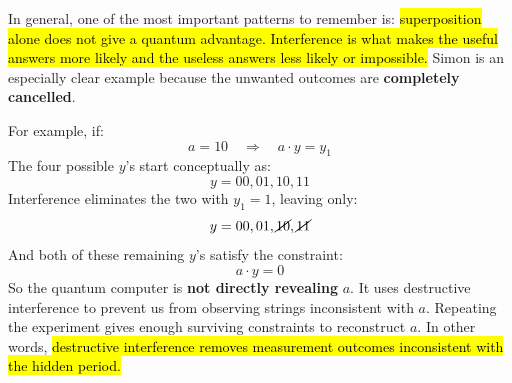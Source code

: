 \begin{remarkbox}
    \highspace
    In general, one of the most important patterns to remember is: \hl{superposition alone does not give a quantum advantage. Interference is what makes the useful answers more likely and the useless answers less likely or impossible.} Simon is an especially clear example because the unwanted outcomes are \textbf{completely cancelled}.

    \highspace
    For example, if:
    \begin{equation*}
        a = 10 \quad \Rightarrow \quad a \cdot y = y_1
    \end{equation*}
    The four possible $y$'s start conceptually as:
    \begin{equation*}
        y = 00, 01, 10, 11
    \end{equation*}
    Interference eliminates the two with $y_1=1$, leaving only:
    \begin{equation*}
        y = 00, 01, \cancel{10}, \cancel{11}
    \end{equation*}
    And both of these remaining $y$'s satisfy the constraint:
    \begin{equation*}
        a \cdot y = 0
    \end{equation*}
    So the quantum computer is \textbf{not directly revealing} $a$. It uses destructive interference to prevent us from observing strings inconsistent with $a$. Repeating the experiment gives enough surviving constraints to reconstruct $a$. In other words, \hl{destructive interference removes measurement outcomes inconsistent with the hidden period.}
\end{remarkbox}

